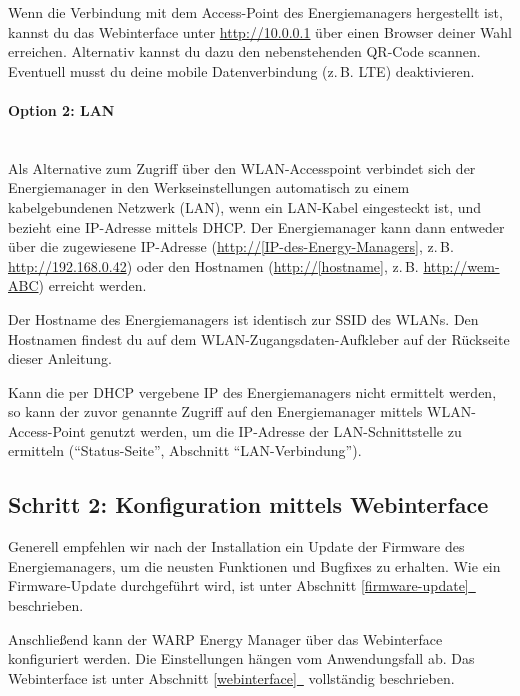 \documentclass[a4paper,10pt]{article}
\newcommand*{\fullref}[1]{Abschnitt \hyperref[{#1}]{\ref*{#1}~\nameref*{#1}}}
\begin{document}
\begin{multicols*}{2}
	\begin{minipage}{0.35\textwidth}
		Wenn die Verbindung mit dem Access-Point des Energiemanagers hergestellt ist, kannst du das Webinterface
		unter \url{http://10.0.0.1} über einen Browser deiner Wahl erreichen.
		Alternativ kannst du dazu den nebenstehenden QR-Code scannen.
		Eventuell musst du deine mobile Datenverbindung (z.\,B. LTE) deaktivieren.
	\end{minipage}\hfill
	\begin{minipage}{0.12\textwidth}
		\begin{flushright}
		\end{flushright}
	\end{minipage}

	\paragraph{Option 2: LAN}\ \\
	Als Alternative zum Zugriff über den WLAN-Accesspoint verbindet sich der
	Energiemanager in den Werkseinstellungen automatisch zu einem
	kabelgebundenen Netzwerk (LAN), wenn ein LAN-Kabel eingesteckt ist, und bezieht eine IP-Adresse
	mittels DHCP. Der Energiemanager kann dann entweder über die zugewiesene IP-Adresse
	(\url{http://[IP-des-Energy-Managers]}, z.\,B. \url{http://192.168.0.42})
	oder den Hostnamen (\url{http://[hostname]}, z.\,B. \url{http://wem-ABC}) erreicht werden.

	Der Hostname des Energiemanagers ist identisch zur SSID des WLANs. Den Hostnamen findest du
	auf dem WLAN-Zugangsdaten-Aufkleber auf der Rückseite dieser Anleitung.

	Kann die per DHCP vergebene IP des Energiemanagers nicht ermittelt werden, so kann der
	zuvor genannte Zugriff auf den Energiemanager mittels WLAN-Access-Point genutzt
	werden, um die IP-Adresse der LAN-Schnittstelle zu ermitteln
	(\enquote{Status-Seite}, Abschnitt \enquote{LAN-Verbindung}).


	\subsection{Schritt 2: Konfiguration mittels Webinterface}
	Generell empfehlen wir nach der Installation ein Update der Firmware des
	Energiemanagers, um die neusten Funktionen und Bugfixes zu erhalten. Wie ein
	Firmware-Update durchgeführt wird, ist unter \fullref{firmware-update}
	beschrieben.

	Anschließend kann der WARP Energy Manager über das Webinterface konfiguriert
	werden. Die Einstellungen hängen vom Anwendungsfall ab.
	Das Webinterface ist unter \fullref{webinterface} vollständig beschrieben.


\end{multicols*}
\end{document}
